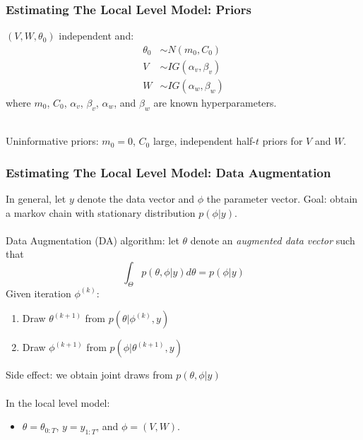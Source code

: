 \documentclass[xcolor=dvipsnames]{beamer}\usepackage{graphicx, color}
\begin{document}
\begin{frame}
  \frametitle{Estimating The Local Level Model: Priors}
$(V,W,\theta_0)$ independent and:
\begin{align*}
  \theta_0 &\sim N(m_0, C_0)\\
  V &\sim IG(\alpha_v, \beta_v)\\
  W &\sim IG(\alpha_w, \beta_w)
\end{align*}
where $m_0$, $C_0$, $\alpha_v$, $\beta_v$, $\alpha_w$, and $\beta_w$ are known hyperparameters.\\~\\\pause

Uninformative priors: $m_0=0$, $C_0$ large, independent half-$t$ priors for $V$ and $W$.
\end{frame}

\begin{frame}
  \frametitle{Estimating The Local Level Model: Data Augmentation}
In general, let $y$ denote the data vector and $\phi$ the parameter vector. Goal: obtain a markov chain with stationary distribution $p(\phi|y)$.\\~\\

Data Augmentation (DA) algorithm: let $\theta$ denote an {\it \color{red} augmented data vector} such that 
\[
\int_\Theta p(\theta,\phi|y)d\theta = p(\phi|y)
\] 
Given iteration $\phi^{(k)}$:
\begin{enumerate}
  \item Draw $\theta^{(k+1)}$ from $p(\theta|\phi^{(k)}, y)$\\
  \item Draw $\phi^{(k+1)}$ from $p(\phi|\theta^{(k+1)}, y)$\\
\end{enumerate}
\pause
Side effect: we obtain joint draws from $p(\theta,\phi|y)$\\~\\

In the local level model:
\begin{itemize}
\item[] $\theta=\theta_{0:T}$, $y=y_{1:T}$, and $\phi=(V,W)$.
\end{itemize}
\end{frame}
\end{document}
